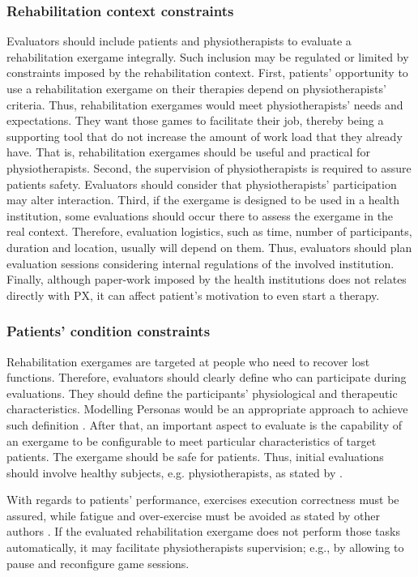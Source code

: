 \subsubsection{Rehabilitation context constraints}
\label{sec:reh_context_constraints}
Evaluators should include patients and physiotherapists to evaluate a rehabilitation exergame integrally. Such inclusion may be regulated or limited by constraints imposed by the rehabilitation context. First, patients' opportunity to use a rehabilitation exergame on their therapies depend on physiotherapists' criteria. Thus, rehabilitation exergames would meet physiotherapists' needs and expectations. They want those games to facilitate their job, thereby being a supporting tool that do not increase the amount of work load that they already have. That is, rehabilitation exergames should be useful and practical for physiotherapists. Second, the supervision of physiotherapists is required to assure patients safety. Evaluators should consider that physiotherapists’ participation may alter interaction.  Third, if the exergame is designed to be used in a health institution, some evaluations should occur there to assess the exergame in the real context. Therefore, evaluation logistics, such as time, number of participants, duration and location, usually will depend on them. Thus, evaluators should plan evaluation sessions considering internal regulations of the involved institution. Finally, although paper-work imposed by the health institutions does not relates directly with \ac{PX}, it can affect patient's motivation to even start a therapy.

\subsubsection{Patients' condition constraints}
\label{sec:reh_patients_constraints}
Rehabilitation exergames are targeted at people who need to recover lost functions. Therefore, evaluators should clearly define who can participate during evaluations. They should define the participants' physiological and therapeutic characteristics. Modelling Personas would be an appropriate approach to achieve such definition \autocite{Mader2012}. After that, an important aspect to evaluate is the capability of an exergame to be configurable to meet particular characteristics of target patients. The exergame should be safe for patients. Thus, initial evaluations should involve healthy subjects, e.g. physiotherapists, as stated by \textcite{Chu2011}.

With regards to patients' performance, exercises execution correctness must be assured, while fatigue and over-exercise must be avoided as stated by other authors \autocite{Pasch2009,Isbister2015,Zhang2011}. If the evaluated rehabilitation exergame does not perform those tasks automatically, it may facilitate physiotherapists supervision; e.g., by allowing to pause and reconfigure game sessions.

